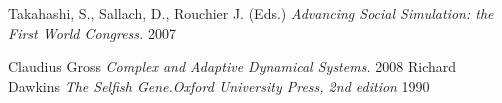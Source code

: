 \documentclass[11pt,oneside,a4paper,openright]{report}
\begin{document}
\begin{thebibliography}{13}
	Takahashi, S., Sallach, D., Rouchier J. (Eds.)
	\emph{Advancing Social Simulation: the First World Congress.}
	2007	

	Claudius Gross
	\emph{Complex and Adaptive Dynamical Systems.}
	2008	
	Richard Dawkins
	\emph{The Selfish Gene.Oxford University Press, 2nd edition}	
	1990

\end{thebibliography}
\end{document}
